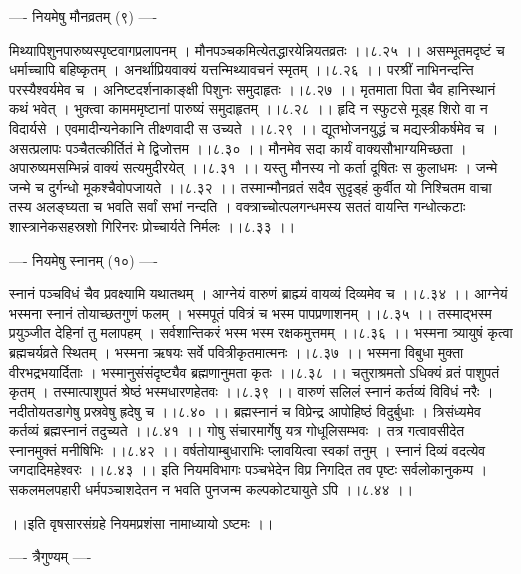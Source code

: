 \documentclass[11pt]{book}
\begin{document}
\begin{landscape}
---- नियमेषु मौनव्रतम् (९) ----

मिथ्यापिशुनपारुष्यस्पृष्टवागप्रलापनम् ।
मौनपञ्चकमित्येतद्धारयेन्नियतव्रतः ।।८.२५ ।।
असम्भूतमदृष्टं च धर्माच्चापि बहिष्कृतम् ।
अनर्थाप्रियवाक्यं यत्तन्मिथ्यावचनं स्मृतम् ।।८.२६ ।।
परश्रीं नाभिनन्दन्ति परस्यैश्वर्यमेव च ।
अनिष्टदर्शनाकाङ्क्षी पिशुनः समुदाहृतः ।।८.२७ ।।
मृतमाता पिता चैव हानिस्थानं कथं भवेत् ।
भुक्त्वा कामममृष्टानां पारुष्यं समुदाहृतम् ।।८.२८ ।।
हृदि न स्फुटसे मूड्ह शिरो वा न विदार्यसे ।
एवमादीन्यनेकानि तीक्ष्णवादी स उच्यते ।।८.२९ ।।
द्यूतभोजनयुद्धं च मद्यस्त्रीकर्षमेव च ।
असत्प्रलापः पञ्चैतत्कीर्तितं मे द्विजोत्तम ।।८.३० ।।
मौनमेव सदा कार्यं वाक्यसौभाग्यमिच्छता ।
अपारुष्यमसम्भिन्नं वाक्यं सत्यमुदीरयेत् ।।८.३१ ।।
यस्तु मौनस्य नो कर्ता दूषितः स कुलाधमः ।
जन्मे जन्मे च दुर्गन्धो मूकश्चैवोपजायते ।।८.३२ ।।
तस्मान्मौनव्रतं सदैव सुदृड्हं कुर्वीत यो निश्चितम
वाचा तस्य अलङ्घ्यता च भवति सर्वां सभां नन्दति ।
वक्त्राच्चोत्पलगन्धमस्य सततं वायन्ति गन्धोत्कटाः
शास्त्रानेकसहस्रशो गिरिनरः प्रोच्चार्यते निर्मलः ।।८.३३ ।।

---- नियमेषु स्नानम् (१०) ----

स्नानं पञ्चविधं चैव प्रवक्ष्यामि यथातथम् ।
आग्नेयं वारुणं ब्राह्म्यं वायव्यं दिव्यमेव च ।।८.३४ ।।
आग्नेयं भस्मना स्नानं तोयाच्छतगुणं फलम् ।
भस्मपूतं पवित्रं च भस्म पापप्रणाशनम् ।।८.३५ ।।
तस्माद्भस्म प्रयुञ्जीत देहिनां तु मलापहम् ।
सर्वशान्तिकरं भस्म भस्म रक्षकमुत्तमम् ।।८.३६ ।।
भस्मना त्र्यायुषं कृत्वा ब्रह्मचर्यव्रते स्थितम् ।
भस्मना ऋषयः सर्वे पवित्रीकृतमात्मनः ।।८.३७ ।।
भस्मना विबुधा मुक्ता वीरभद्रभयार्दिताः ।
भस्मानुसंसंदृष्ट्यैव ब्रह्मणानुमता कृतः ।।८.३८ ।।
चतुराश्रमतो ऽधिक्यं व्रतं पाशुपतं कृतम् ।
तस्मात्पाशुपतं श्रेष्ठं भस्मधारणहेतवः ।।८.३९ ।।
वारुणं सलिलं स्नानं कर्तव्यं विविधं नरैः ।
नदीतोयतडागेषु प्रस्रवेषु ह्रदेषु च ।।८.४० ।।
ब्रह्मस्नानं च विप्रेन्द्र आपोहिष्ठं विदुर्बुधाः ।
त्रिसंध्यमेव कर्तव्यं ब्रह्मस्नानं तदुच्यते ।।८.४१ ।।
गोषु संचारमार्गेषु यत्र गोधूलिसम्भवः ।
तत्र गत्वावसीदेत स्नानमुक्तं मनीषिभिः ।।८.४२ ।।
वर्षतोयाम्बुधाराभिः प्लावयित्वा स्वकां तनुम् ।
स्नानं दिव्यं वदत्येव जगदादिमहेश्वरः ।।८.४३ ।।
इति नियमविभागः पञ्चभेदेन विप्र
निगदित तव पृष्टः सर्वलोकानुकम्प ।
सकलमलपहारी धर्मपञ्चाशदेतन
न भवति पुनजन्म कल्पकोट्यायुते ऽपि ।।८.४४ ।।

 ।।इति वृषसारसंग्रहे नियमप्रशंसा नामाध्यायो ऽष्टमः ।।





---- त्रैगुण्यम् ----


\end{landscape}
\end{document}
